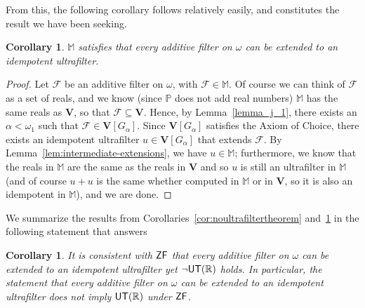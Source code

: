 \documentclass[10pt]{amsart}
\newcommand{\zf}{\mathnormal{\mathsf{ZF}}}
\newcommand{\utr}{\mathnormal{\mathsf{UT}(\mathbb R)}}
\newtheorem{corollary}[theorem]{Corollary}
\theoremstyle{definition}
\theoremstyle{remark}
\begin{document}
From this, the following corollary follows relatively easily, and constitutes the result we have been seeking.

\begin{corollary}\label{cor:extendadditive}
$\mathbb{M}$ satisfies that every additive filter on $\omega$ can be extended to an idempotent ultrafilter. 
\end{corollary}

\begin{proof}
Let $\mathscr{F}$ be an additive filter on $\omega$, with $\mathscr F\in\mathbb{M}$. Of course we can think of $\mathscr F$ as a set of reals, and we know (since $\mathbb P$ does not add real numbers) $\mathbb M$ has the same reals as $\mathbf{V}$, so that $\mathscr F\subseteq\mathbf{V}$. Hence, by Lemma~\ref{lemma_j_1}, there exists an $\alpha <\omega_1$ such that $\mathscr F\in \mathbf{V}[G_\alpha]$. Since $\mathbf{V}[G_\alpha]$ satisfies the Axiom of Choice, there exists an idempotent ultrafilter $u\in\mathbf{V}[G_\alpha]$ that extends $\mathscr F$. By Lemma~\ref{lem:intermediate-extensions}, we have $u\in\mathbb M$; furthermore, we know that the reals in $\mathbb M$ are the same as the reals in $\mathbf{V}$ and so $u$ is still an ultrafilter in $\mathbb M$ (and of course $u+u$ is the same whether computed in $\mathbb M$ or in $\mathbf{V}$, so it is also an idempotent in $\mathbb M$), and we are done.
\end{proof}

We summarize the results from Corollaries~\ref{cor:noultrafiltertheorem} and~\ref{cor:extendadditive} in the following statement that answers~\cite[Question (2), p. 410]{dinasso-tachtsis}

\begin{corollary}
It is consistent with $\zf$ that every additive filter on $\omega$ can be extended to an idempotent ultrafilter yet $\neg\utr$ holds. In particular, the statement that every additive filter on $\omega$ can be extended to an idempotent ultrafilter does not imply $\utr$ under $\zf$.
\end{corollary}
\end{document}
